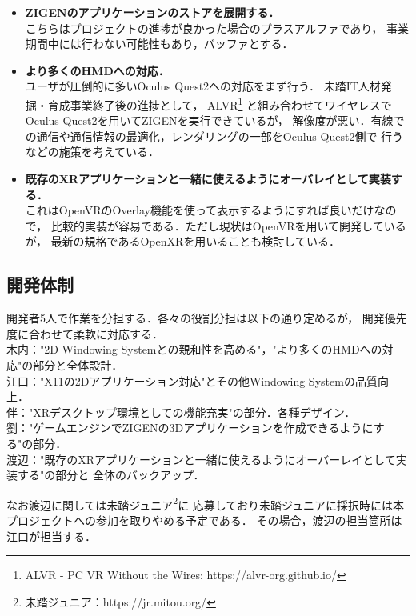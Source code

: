\begin{itemize}
      \item \textbf{ZIGENのアプリケーションのストアを展開する．\\}
            こちらはプロジェクトの進捗が良かった場合のプラスアルファであり，
            事業期間中には行わない可能性もあり，バッファとする．

      \item \textbf{より多くのHMDへの対応．\\}
            ユーザが圧倒的に多いOculus Quest2への対応をまず行う．
            未踏IT人材発掘・育成事業終了後の進捗として，
            ALVR\footnote{ALVR - PC VR Without the Wires: https://alvr-org.github.io/}
            と組み合わせてワイヤレスでOculus Quest2を用いてZIGENを実行できているが，
            解像度が悪い．有線での通信や通信情報の最適化，レンダリングの一部をOculus Quest2側で
            行うなどの施策を考えている．

      \item \textbf{既存のXRアプリケーションと一緒に使えるようにオーバレイとして実装する．\\}
            これはOpenVRのOverlay機能を使って表示するようにすれば良いだけなので，
            比較的実装が容易である．ただし現状はOpenVRを用いて開発しているが，
            最新の規格であるOpenXRを用いることも検討している．
\end{itemize}

\subsection{開発体制}

開発者5人で作業を分担する．各々の役割分担は以下の通り定めるが，
開発優先度に合わせて柔軟に対応する．\\
木内："2D Windowing Systemとの親和性を高める"，"より多くのHMDへの対応"の部分と全体設計．\\
江口："X11の2Dアプリケーション対応"とその他Windowing Systemの品質向上．\\
伴："XRデスクトップ環境としての機能充実"の部分．各種デザイン．\\
劉："ゲームエンジンでZIGENの3Dアプリケーションを作成できるようにする"の部分．\\
渡辺："既存のXRアプリケーションと一緒に使えるようにオーバーレイとして実装する"の部分と
全体のバックアップ．

なお渡辺に関しては未踏ジュニア\footnote{未踏ジュニア：https://jr.mitou.org/}に
応募しており未踏ジュニアに採択時には本プロジェクトへの参加を取りやめる予定である．
その場合，渡辺の担当箇所は江口が担当する．

